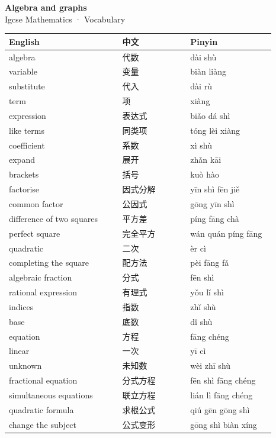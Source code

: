 \documentclass[11pt]{article}
\begin{document}
\begin{center}
  {\LARGE\bfseries Algebra and graphs}\\[0.35em]
  {\large Igcse Mathematics · Vocabulary}
\end{center}
\vspace{0.6em}

\begin{longtable}{@{}p{0.40\linewidth}p{0.24\linewidth}p{0.30\linewidth}@{}}
\toprule
\textbf{English} & \textbf{中文} & \textbf{Pinyin} \\
\midrule
\endhead
\bottomrule
\endlastfoot
algebra & 代数 & dài shù \\
variable & 变量 & biàn liàng \\
substitute & 代入 & dài rù \\
term & 项 & xiàng \\
expression & 表达式 & biǎo dá shì \\
like terms & 同类项 & tóng lèi xiàng \\
coefficient & 系数 & xì shù \\
expand & 展开 & zhǎn kāi \\
brackets & 括号 & kuò hào \\
factorise & 因式分解 & yīn shì fēn jiě \\
common factor & 公因式 & gōng yīn shì \\
difference of two squares & 平方差 & píng fāng chà \\
perfect square & 完全平方 & wán quán píng fāng \\
quadratic & 二次 & èr cì \\
completing the square & 配方法 & pèi fāng fǎ \\
algebraic fraction & 分式 & fēn shì \\
rational expression & 有理式 & yǒu lǐ shì \\
indices & 指数 & zhǐ shù \\
base & 底数 & dǐ shù \\
equation & 方程 & fāng chéng \\
linear & 一次 & yī cì \\
unknown & 未知数 & wèi zhī shù \\
fractional equation & 分式方程 & fēn shì fāng chéng \\
simultaneous equations & 联立方程 & lián lì fāng chéng \\
quadratic formula & 求根公式 & qiú gēn gōng shì \\
change the subject & 公式变形 & gōng shì biàn xíng \\

\end{longtable}
\end{document}
